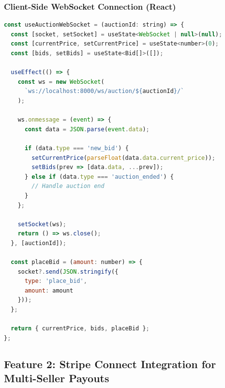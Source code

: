 \documentclass[12pt,a4paper]{article}
\begin{document}
\subsubsection{Client-Side WebSocket Connection (React)}
\begin{lstlisting}[language=JavaScript, caption={React WebSocket Hook for Auction Bidding}]
const useAuctionWebSocket = (auctionId: string) => {
  const [socket, setSocket] = useState<WebSocket | null>(null);
  const [currentPrice, setCurrentPrice] = useState<number>(0);
  const [bids, setBids] = useState<Bid[]>([]);

  useEffect(() => {
    const ws = new WebSocket(
      `ws://localhost:8000/ws/auction/${auctionId}/`
    );

    ws.onmessage = (event) => {
      const data = JSON.parse(event.data);
      
      if (data.type === 'new_bid') {
        setCurrentPrice(parseFloat(data.data.current_price));
        setBids(prev => [data.data, ...prev]);
      } else if (data.type === 'auction_ended') {
        // Handle auction end
      }
    };

    setSocket(ws);
    return () => ws.close();
  }, [auctionId]);

  const placeBid = (amount: number) => {
    socket?.send(JSON.stringify({
      type: 'place_bid',
      amount: amount
    }));
  };

  return { currentPrice, bids, placeBid };
};
\end{lstlisting}

\subsection{Feature 2: Stripe Connect Integration for Multi-Seller Payouts}
\end{document}

